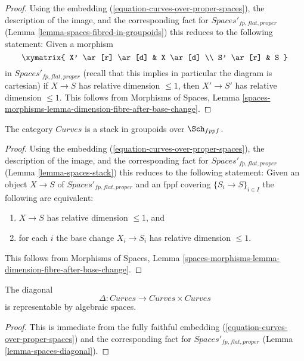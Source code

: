 \begin{proof}
Using the embedding (\ref{equation-curves-over-proper-spaces}),
the description of the image, and
the corresponding fact for $\textit{Spaces}'_{fp, flat, proper}$
(Lemma \ref{lemma-spaces-fibred-in-groupoids})
this reduces to the following statement: Given a morphism
$$
\xymatrix{
X' \ar[r] \ar[d] & X \ar[d] \\
S' \ar[r] & S
}
$$
in $\textit{Spaces}'_{fp, flat, proper}$ (recall that this implies
in particular the diagram is cartesian)
if $X \to S$ has relative dimension $\leq 1$, then $X' \to S'$
has relative dimension $\leq 1$.
This follows from Morphisms of Spaces, Lemma
\ref{spaces-morphisms-lemma-dimension-fibre-after-base-change}.
\end{proof}

\begin{lemma}
\label{lemma-curves-stack}
The category $\textit{Curves}$ is a stack in groupoids over $\Sch_{fppf}$.
\end{lemma}

\begin{proof}
Using the embedding (\ref{equation-curves-over-proper-spaces}),
the description of the image, and
the corresponding fact for $\textit{Spaces}'_{fp, flat, proper}$
(Lemma \ref{lemma-spaces-stack})
this reduces to the following statement: Given an object
$X \to S$ of $\textit{Spaces}'_{fp, flat, proper}$
and an fppf covering $\{S_i \to S\}_{i \in I}$
the following are equivalent:
\begin{enumerate}
\item $X \to S$ has relative dimension $\leq 1$, and
\item for each $i$ the base change $X_i \to S_i$
has relative dimension $\leq 1$.
\end{enumerate}
This follows from Morphisms of Spaces, Lemma
\ref{spaces-morphisms-lemma-dimension-fibre-after-base-change}.
\end{proof}

\begin{lemma}
\label{lemma-curves-diagonal}
The diagonal
$$
\Delta : \textit{Curves} \longrightarrow \textit{Curves} \times \textit{Curves}
$$
is representable by algebraic spaces.
\end{lemma}

\begin{proof}
This is immediate from the fully faithful embedding
(\ref{equation-curves-over-proper-spaces}) and
the corresponding fact for $\textit{Spaces}'_{fp, flat, proper}$
(Lemma \ref{lemma-spaces-diagonal}).
\end{proof}

